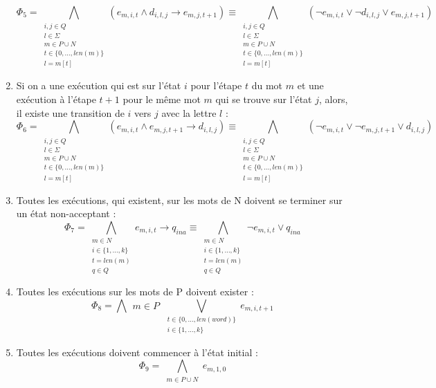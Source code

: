 \documentclass[a4paper, 12pt]{extarticle}
\begin{document}
\begin{enumerate}
    \begin{equation*}
        \Phi_5=\bigwedge_{\substack{i,j \in Q\\l \in \Sigma\\m \in P\cup N\\t \in \{0,\dots,len(m)\}\\l=m[t]}} (e_{m,i,t} \wedge d_{i,l,j} \rightarrow e_{m,j,t+1}) \equiv
        \bigwedge_{\substack{i,j \in Q\\l \in \Sigma\\m \in P\cup N\\t \in \{0,\dots,len(m)\}\\l=m[t]}} (\neg e_{m,i,t} \vee \neg d_{i,l,j} \vee e_{m,j,t+1})
    \end{equation*}
    \item Si on a une exécution qui est sur l'état $i$ pour l'étape $t$ du mot $m$ et une exécution à l'étape $t+1$ pour le même mot $m$ qui se trouve sur l'état $j$,
    alors, il existe une transition de $i$ vers $j$ avec la lettre $l$ :
    \begin{equation*}
        \Phi_6=\bigwedge_{\substack{i,j \in Q\\l \in \Sigma\\m \in P\cup N\\t \in \{0,\dots,len(m)\}\\l=m[t]}} (e_{m,i,t} \wedge e_{m,j,t+1} \rightarrow d_{i,l,j})\equiv
        \bigwedge_{\substack{i,j \in Q\\l \in \Sigma\\m \in P\cup N\\t \in \{0,\dots,len(m)\}\\l=m[t]}} (\neg e_{m,i,t} \vee \neg e_{m,j,t+1} \vee d_{i,l,j})
    \end{equation*}
    \item Toutes les exécutions, qui existent, sur les mots de N doivent se terminer sur un état non-acceptant :
    \begin{equation*}
        \Phi_7=\bigwedge_{\substack{m \in N\\i \in \{1,\dots,k\}\\t=len(m)\\q\in Q}} e_{m,i,t} \rightarrow q_{ina}\equiv
        \bigwedge_{\substack{m \in N\\i \in \{1,\dots,k\}\\t=len(m)\\q\in Q}} \neg e_{m,i,t} \vee q_{ina}
    \end{equation*}
    \item Toutes les exécutions sur les mots de P doivent exister :
    \begin{equation*}
        \Phi_8=\bigwedge{\substack{m\in P}}\bigvee_{\substack{t\in\{0,\dots,len(word)\}\\i\in \{1,\dots,k\}}} e_{m,i,t+1}
    \end{equation*}
    \item Toutes les exécutions doivent commencer à l'état initial :
    \begin{equation*}
        \Phi_9=\bigwedge_{\substack{m\in P\cup N}} e_{m,1,0}
    \end{equation*}
\end{enumerate}
\end{document}

